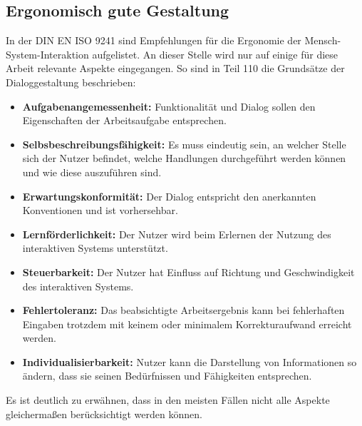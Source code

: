 \subsection{Ergonomisch gute Gestaltung}


In der DIN EN ISO 9241 sind Empfehlungen für die Ergonomie der Mensch-System-Interaktion aufgelistet. An dieser Stelle wird nur auf einige für diese Arbeit relevante Aspekte eingegangen. So sind in Teil 110 die Grundsätze der Dialoggestaltung beschrieben:
\begin{itemize}
\item \textbf{Aufgabenangemessenheit:} Funktionalität und Dialog sollen den Eigenschaften der Arbeitsaufgabe entsprechen.
\item \textbf{Selbsbeschreibungsfähigkeit:}  Es muss eindeutig sein, an welcher Stelle sich der Nutzer befindet, welche Handlungen durchgeführt werden können und wie diese auszuführen sind.
\item \textbf{Erwartungskonformität:} Der Dialog entspricht den anerkannten Konventionen und ist vorhersehbar.
\item \textbf{Lernförderlichkeit:} Der Nutzer wird beim Erlernen der Nutzung des interaktiven Systems unterstützt.
\item \textbf{Steuerbarkeit:} Der Nutzer hat Einfluss auf Richtung und Geschwindigkeit des interaktiven Systems.
\item \textbf{Fehlertoleranz:} Das beabsichtigte Arbeitsergebnis kann bei fehlerhaften Eingaben trotzdem mit keinem oder minimalem Korrekturaufwand erreicht werden.
\item \textbf{Individualisierbarkeit:} Nutzer kann die Darstellung von Informationen so ändern, dass sie seinen Bedürfnissen und Fähigkeiten entsprechen.
\end{itemize}
Es ist deutlich zu erwähnen, dass in den meisten Fällen nicht alle Aspekte gleichermaßen berücksichtigt werden können.

